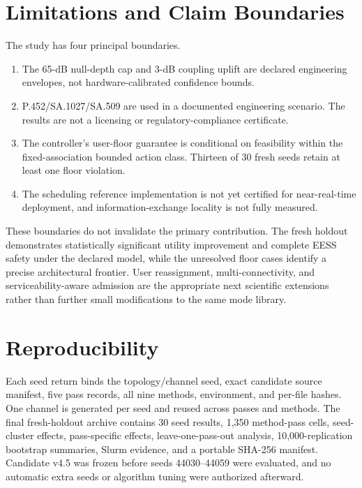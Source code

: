 \documentclass[journal]{IEEEtran}
\begin{document}
\section{Limitations and Claim Boundaries}
The study has four principal boundaries.
\begin{enumerate}
\item The 65-dB null-depth cap and 3-dB coupling uplift are declared engineering envelopes, not hardware-calibrated confidence bounds.
\item P.452/SA.1027/SA.509 are used in a documented engineering scenario. The results are not a licensing or regulatory-compliance certificate.
\item The controller's user-floor guarantee is conditional on feasibility within the fixed-association bounded action class. Thirteen of 30 fresh seeds retain at least one floor violation.
\item The scheduling reference implementation is not yet certified for near-real-time deployment, and information-exchange locality is not fully measured.
\end{enumerate}
These boundaries do not invalidate the primary contribution. The fresh holdout demonstrates statistically significant utility improvement and complete EESS safety under the declared model, while the unresolved floor cases identify a precise architectural frontier. User reassignment, multi-connectivity, and serviceability-aware admission are the appropriate next scientific extensions rather than further small modifications to the same mode library.

\section{Reproducibility}
Each seed return binds the topology/channel seed, exact candidate source manifest, five pass records, all nine methods, environment, and per-file hashes. One channel is generated per seed and reused across passes and methods. The final fresh-holdout archive contains 30 seed results, 1,350 method-pass cells, seed-cluster effects, pass-specific effects, leave-one-pass-out analysis, 10,000-replication bootstrap summaries, Slurm evidence, and a portable SHA-256 manifest. Candidate v4.5 was frozen before seeds 44030--44059 were evaluated, and no automatic extra seeds or algorithm tuning were authorized afterward.
\end{document}
